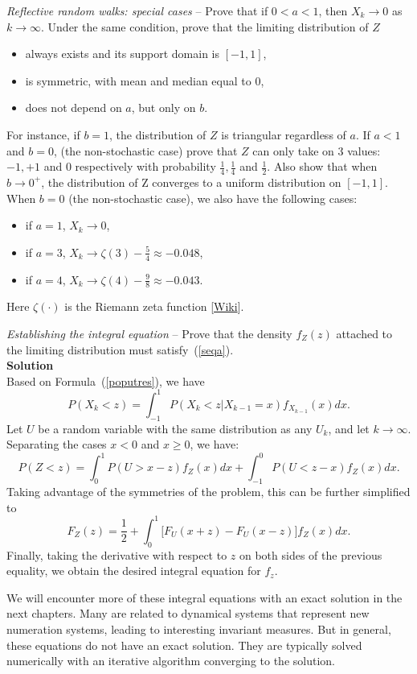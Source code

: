 \documentclass[oneside,10pt]{book}
\newcommand{\qed}{\nobreak \ifvmode \relax \else
      \ifdim\lastskip<1.5em \hskip-\lastskip
      \hskip1.5em plus0em minus0.5em \fi \nobreak
      \vrule height0.75em width0.5em depth0.25em\fi}
\begin{document}
\begin{Exercise} {\em Reflective random walks: special cases} -- Prove that if $0<a < 1$, then  $X_k\rightarrow 0$ as
$k\rightarrow\infty$. Under the same condition, prove that the limiting distribution of $Z$
\begin{itemize}
\item	always exists and its support domain is $[-1, 1]$,
\item is symmetric, with mean and median equal to 0,
\item does not depend on $a$, but only on $b$.
\end{itemize}
For instance, if $b =1$, the distribution of $Z$ is triangular regardless of $a$. If $a < 1$ and $b = 0$, (the non-stochastic case) prove that
$Z$ can only take on 3 values: $-1,+1$ and $0$ respectively with probability $\frac{1}{4},\frac{1}{4}$ and $\frac{1}{2}$.
Also show that when $b\rightarrow 0^{+}$,  the distribution of Z converges to a uniform distribution on $[-1, 1]$.
When $b=0$ (the non-stochastic case), we also have the following cases:
\begin{itemize}
\item if $a=1$, $X_k\rightarrow 0$,
\item 	if $a = 3$, $X_k\rightarrow \zeta(3) -\frac{5}{4}\approx -0.048$,
\item	if $a = 4$, $X_k\rightarrow \zeta(4) -\frac{9}{8}\approx -0.043$.
\end{itemize}
Here $\zeta(\cdot)$ is the \textcolor{index}{Riemann zeta function} [\href{https://en.wikipedia.org/wiki/Riemann_zeta_function}{Wiki}].
\end{Exercise}

\begin{Exercise}\label{knorr} {\em Establishing the integral equation} -- Prove that the density $f_Z(z)$ attached to the limiting distribution must
satisfy~(\ref{seqa}). \vspace{1ex} \\
{\bf Solution} \\
Based on Formula~(\ref{poputres}), we have
$$
P(X_k<z) = \int_{-1}^1 P(X_k < z | X_{k-1} = x) f_{X_{k-1}}(x) dx.
$$
Let $U$ be a random variable with the same distribution as any $U_k$, and let $k\rightarrow\infty$. Separating the cases $x<0$ and $x\geq 0$, we have:
$$
P(Z<z) = \int_0^1 P(U > x-z )f_Z(x)dx + \int_{-1}^0 P(U < z-x )f_Z(x)dx.
$$
Taking advantage of the symmetries of the problem, this can be further simplified to
$$
F_Z(z) = \frac{1}{2} + \int_0^1 \Big[F_U(x+z)-F_U(x-z)\Big] f_Z(x)dx.
$$
Finally, taking the derivative with respect to $z$ on both sides of the previous equality, we obtain the desired integral equation for $f_z$. \qed

We will encounter more of these integral equations with an exact solution in the next chapters. Many are related to dynamical systems that represent new numeration systems, leading to interesting invariant measures. But in general, these equations do not have an exact solution. They are typically solved numerically with an iterative algorithm converging to the solution.

\end{Exercise}
\end{document}
